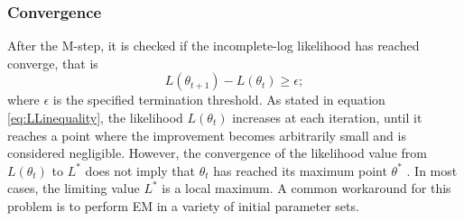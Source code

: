 \subsubsection{Convergence}
\label{sec:convergence}
After the M-step, it is checked if the incomplete-log likelihood has reached converge, that is
\begin{equation*}
    L(\theta_{t+1}) -L(\theta_{t}) \geqslant \epsilon ;
\end{equation*}
where $\epsilon$ is the specified termination threshold. As stated in equation \ref{eq:LLinequality}, the likelihood $\displaystyle L(\theta _{t})$ increases at each iteration, until it reaches a point where the improvement becomes arbitrarily small and is considered negligible. However, the convergence of the likelihood value from $L(\theta_{t})$ to $L^*$ does not imply that $\theta_{t}$ has reached its maximum point $\theta^*$ \cite{McLachlan2019}. In most cases, the limiting value $L^*$ is a local maximum. A common workaround for this problem is to perform EM in a variety of initial parameter sets.

